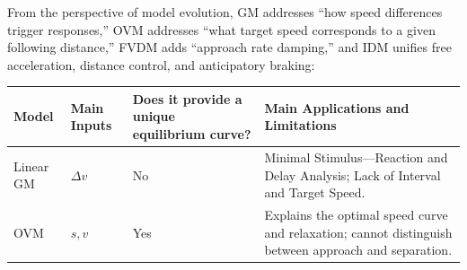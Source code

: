 \documentclass[11pt,a4paper,openany]{book}
\numberwithin{equation}{chapter}
\numberwithin{figure}{chapter}
\numberwithin{table}{chapter}
\begin{document}
From the perspective of model evolution, GM addresses “how speed differences trigger responses,” OVM addresses “what target speed corresponds to a given following distance,” FVDM adds “approach rate damping,” and IDM unifies free acceleration, distance control, and anticipatory braking:







\begin{center}
\small
{}
\label{tab:car-following-models}
\begin{tabular}{p{2.1cm}p{3.3cm}p{3.6cm}p{4.8cm}}
\toprule







Model




&




 Main Inputs




&




 Does it provide a unique equilibrium curve?




&




 Main Applications and Limitations



\\
\midrule







Linear GM




& $\Delta v$ &




 No& Minimal Stimulus—Reaction and Delay Analysis; Lack of Interval and Target Speed.



\\
OVM & $s,v$ &




 Yes




&




 Explains the optimal speed curve and relaxation; cannot distinguish between approach and separation.




\end{tabular}
\end{center}
\end{document}
